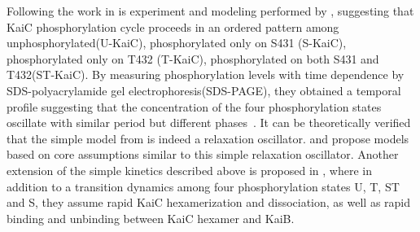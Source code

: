 \documentclass[a4paper,10pt]{article}
\numberwithin{equation}{section}
\begin{document}
Following the work in \citet{nishiwaki2004} is experiment and modeling performed by \citet{rust809}, suggesting that KaiC phosphorylation cycle proceeds in an ordered pattern among unphosphorylated(U-KaiC), phosphorylated only on S431 (S-KaiC), phosphorylated only on T432 (T-KaiC), phosphorylated on both S431 and T432(ST-KaiC).
By measuring phosphorylation levels with time dependence by SDS-polyacrylamide gel electrophoresis(SDS-PAGE), they obtained a temporal profile suggesting that the concentration of the four phosphorylation states oscillate with similar period but different phases~\citet{rust809}. 
It can be theoretically verified that the simple model from \citet{rust809} is indeed a relaxation oscillator. \citet{phong2012} and  \citet{lin2014} propose models based on core assumptions similar to this simple relaxation oscillator. Another extension of the simple kinetics described above is proposed in \citet{brett2010}, where in addition to a transition dynamics among four phosphorylation states U, T, ST and S, they assume rapid KaiC hexamerization and dissociation, as well as rapid binding and unbinding between KaiC hexamer and KaiB. 
\end{document}
